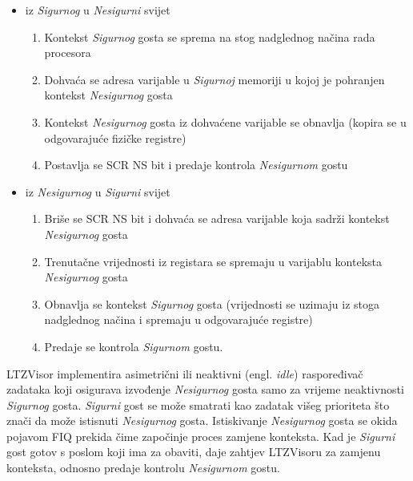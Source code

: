 \documentclass[times, utf8, diplomski, numeric]{fer}
\begin{document}
\begin{itemize}
  \item{iz \textit{Sigurnog} u \textit{Nesigurni} svijet}
      \begin{enumerate}
        \item{Kontekst \textit{Sigurnog} gosta se sprema na stog nadglednog načina rada procesora}
        \item{Dohvaća se adresa varijable u \textit{Sigurnoj} memoriji u kojoj je pohranjen kontekst \textit{Nesigurnog} gosta}
        \item{Kontekst \textit{Nesigurnog} gosta iz dohvaćene varijable se obnavlja (kopira se u odgovarajuće fizičke registre)}
        \item{Postavlja se SCR NS bit i predaje kontrola \textit{Nesigurnom} gostu}
      \end{enumerate}
  \item{iz \textit{Nesigurnog} u \textit{Sigurni} svijet}
      \begin{enumerate}
        \item{Briše se SCR NS bit i dohvaća se adresa varijable koja sadrži kontekst \textit{Nesigurnog} gosta}
        \item{Trenutačne vrijednosti iz registara se spremaju u varijablu konteksta \textit{Nesigurnog} gosta}
        \item{Obnavlja se kontekst \textit{Sigurnog} gosta (vrijednosti se uzimaju iz stoga nadglednog načina i spremaju u odgovarajuće
        registre)}
        \item{Predaje se kontrola \textit{Sigurnom} gostu.}
      \end{enumerate}
\end{itemize}
LTZVisor implementira asimetrični ili neaktivni (engl. \textit{idle}) raspoređivač zadataka koji osigurava izvođenje \textit{Nesigurnog}
gosta samo za vrijeme neaktivnosti \textit{Sigurnog} gosta. \textit{Sigurni} gost se može smatrati kao zadatak višeg prioriteta što znači
da može istisnuti \textit{Nesigurnog} gosta. Istiskivanje \textit{Nesigurnog} gosta se okida pojavom FIQ prekida čime započinje proces zamjene
konteksta. Kad je \textit{Sigurni} gost gotov s poslom koji ima za obaviti, daje zahtjev LTZVisoru za zamjenu konteksta, odnosno predaje
kontrolu \textit{Nesigurnom} gostu.
\end{document}
